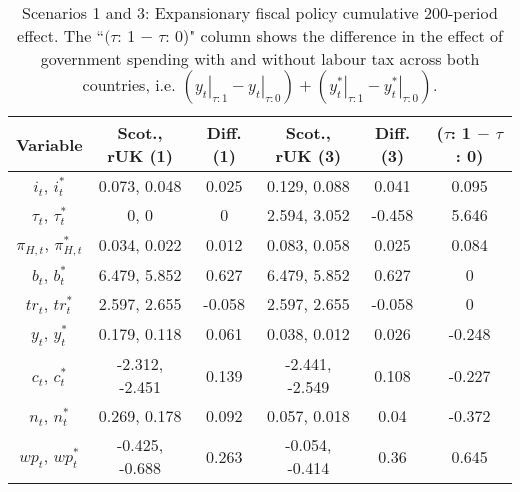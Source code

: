 \begin{table}[H]
\centering
\begin{tabular}{c|cc|cc|c}
  \hline
{\textbf{Variable}} & {\textbf{Scot., rUK (1)}} & {\textbf{Diff. (1)}} & {\textbf{Scot., rUK (3)}} & {\textbf{Diff. (3)}} & {\textbf{($\tau$: 1 $-$ $\tau$: 0)}} \\ 
  \hline
${i_t}$, ${i^*_t}$ & 0.073, 0.048 & 0.025 & 0.129, 0.088 & 0.041 & 0.095 \\ 
  ${\tau_t}$, ${\tau^*_t}$ & 0, 0 & 0 & 2.594, 3.052 & -0.458 & 5.646 \\ 
  ${\pi_{H,t}}$, ${\pi^*_{H,t}}$ & 0.034, 0.022 & 0.012 & 0.083, 0.058 & 0.025 & 0.084 \\ 
  ${b_t}$, ${b^*_t}$ & 6.479, 5.852 & 0.627 & 6.479, 5.852 & 0.627 & 0 \\ 
  ${tr_t}$, ${tr^*_t}$ & 2.597, 2.655 & -0.058 & 2.597, 2.655 & -0.058 & 0 \\ 
  ${y_t}$, ${y^*_t}$ & 0.179, 0.118 & 0.061 & 0.038, 0.012 & 0.026 & -0.248 \\ 
  ${c_t}$, ${c^*_t}$ & -2.312, -2.451 & 0.139 & -2.441, -2.549 & 0.108 & -0.227 \\ 
  ${n_t}$, ${n^*_t}$ & 0.269, 0.178 & 0.092 & 0.057, 0.018 & 0.04 & -0.372 \\ 
  ${wp_t}$, ${wp^*_t}$ & -0.425, -0.688 & 0.263 & -0.054, -0.414 & 0.36 & 0.645 \\ 
\end{tabular}
\vspace{0.5cm}
\caption{Scenarios 1 and 3: Expansionary fiscal policy cumulative 200-period effect. The ``$(\tau$: 1 $-$ $\tau$: 0)" column shows the difference in the effect of government spending with and without labour tax across both countries, i.e. $(\left. y_t \right|_{\tau:1} - \left. y_t \right|_{\tau:0}) + (\left. y^*_t \right|_{\tau:1} - \left. y^*_t \right|_{\tau:0})$.} 
\label{table:responses_one_three}
\end{table}
